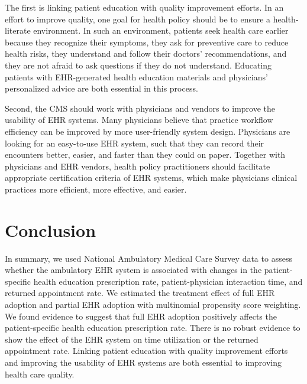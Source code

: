 \documentclass[12pt]{report}
\begin{document}
The first is linking patient education with quality improvement efforts. In an effort to improve quality, one goal for health policy should be to ensure a health-literate environment. In such an environment, patients seek health care earlier because they recognize their symptoms, they ask for preventive care to reduce health risks, they understand and follow their doctors' recommendations, and they are not afraid to ask questions if they do not understand. Educating patients with EHR-generated health education materials and physicians' personalized advice are both essential in this process.

Second, the CMS should work with physicians and vendors to improve the usability of EHR systems. Many physicians believe that practice workflow efficiency can be improved by more user-friendly system design. Physicians are looking for an easy-to-use EHR system, such that they can record their encounters better, easier, and faster than they could on paper. Together with physicians and EHR vendors, health policy practitioners should facilitate appropriate certification criteria of EHR systems, which make physicians clinical practices more efficient, more effective, and easier. 

\chapter{Conclusion}
\label{chapter:conclusion}
In summary, we used National Ambulatory Medical Care Survey data to assess whether the ambulatory EHR system is associated with changes in the patient-specific health education prescription rate, patient-physician interaction time, and returned appointment rate. We estimated the treatment effect of full EHR adoption and partial EHR adoption with multinomial propensity score weighting. We found evidence to suggest that full EHR adoption positively affects the patient-specific health education prescription rate. There is no robust evidence to show the effect of the EHR system on time utilization or the returned appointment rate. Linking patient education with quality improvement efforts and improving the usability of EHR systems are both essential to improving health care quality.

\newpage


\end{document}
